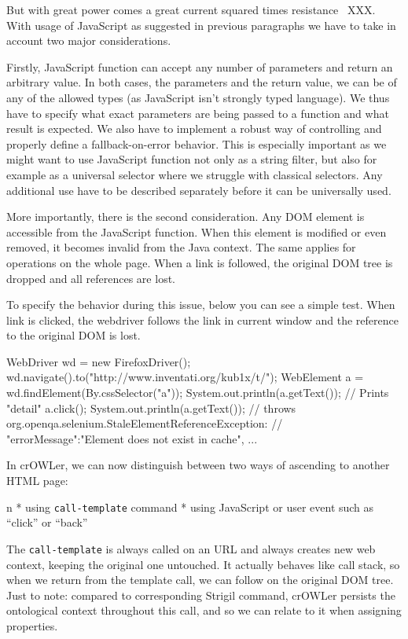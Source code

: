 But with great power comes a great current squared times
resistance~ XXX. With usage of JavaScript as
suggested in previous paragraphs we have to take in account two major
considerations. 

Firstly, JavaScript function can accept any number of parameters and return an
arbitrary value. In both cases, the parameters and the return value, we can be
of any of the allowed types (as JavaScript isn't strongly typed language). We
thus have to specify what exact parameters are being passed to a function and
what result is expected. We also have to implement a robust way of controlling
and properly define a fallback-on-error behavior. This is especially important
as we might want to use JavaScript function not only as a string filter, but also
for example as a universal selector where we struggle with classical selectors. 
Any additional use have to be described separately before it can be universally
used. 

More importantly, there is the second consideration. Any DOM element is
accessible from the JavaScript function. When this element is modified or even
removed, it becomes invalid from the Java context. The same applies for
operations on the whole page. When a link is followed, the original DOM tree 
is dropped and all references are lost. 

To specify the behavior during this issue, below you can see a simple test.
When link is clicked, the webdriver follows the link in current window and the
reference to the original DOM is lost. 

\begtt
WebDriver wd = new FirefoxDriver();
wd.navigate().to("http://www.inventati.org/kub1x/t/");
WebElement a = wd.findElement(By.cssSelector("a"));
System.out.println(a.getText()); // Prints "detail"
a.click();
System.out.println(a.getText());
// throws org.openqa.selenium.StaleElementReferenceException:
// { "errorMessage":"Element does not exist in cache", ... }
\endtt

In crOWLer, we can now distinguish between two ways of ascending to another HTML page: 

\begitems \style n
  * using {\tt call-template} command
  * using JavaScript or user event such as ``click'' or ``back''
\enditems

The {\tt call-template} is always called on an URL and always creates new web
context, keeping the original one untouched. It actually behaves like call
stack, so when we return from the template call, we can follow on the original
DOM tree. Just to note: compared to corresponding Strigil command, crOWLer
persists the ontological context throughout this call, and so we can relate to it
when assigning properties. 

